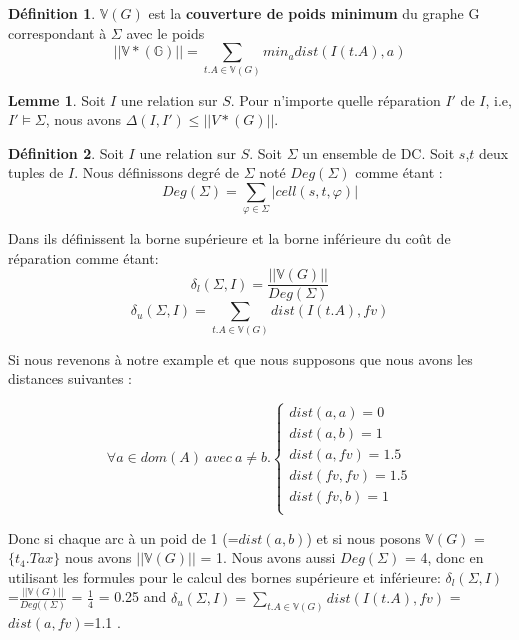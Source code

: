 \documentclass[letterpaper, 12pt]{report}
\theoremstyle{definition}
\newtheorem{mydef}{Définition}
\newtheorem{mylemma}{Lemme}
\begin{document}
\begin{mydef}
	$\mathbb{V}(G)$ est la \textbf{couverture de poids minimum} du graphe G correspondant à $\Sigma$ avec le poids
	$$||\mathbb{V*(G)}|| = \sum_{t.A \in \mathbb{V}(G)} min_{a} dist(I(t.A),a)$$
\end{mydef}

\begin{mylemma}
	Soit $I$ une relation sur $S$. Pour n'importe quelle réparation $I'$ de $I$, i.e, $I' \models \Sigma$, nous avons $\Delta(I,I') \leq ||V*(G)||$. 
\end{mylemma}

\begin{mydef}
	Soit $I$ une relation sur $S$. Soit $\Sigma$ un ensemble de DC. Soit $s$,$t$ deux tuples de $I$. Nous définissons degré de $\Sigma$ noté $Deg(\Sigma)$ comme étant : $$Deg(\Sigma) = \sum_{\varphi \in \Sigma} |cell(s,t,\varphi)|$$
\end{mydef}


Dans \cite{main} ils définissent la borne supérieure et la borne inférieure du coût de réparation comme étant:
$$ \delta_l(\Sigma,I) = \frac{||\mathbb{V}(G)||}{Deg(\Sigma)}$$
$$ \delta_u(\Sigma,I) = \sum_{t.A \in \mathbb{V}(G)} dist(I(t.A),fv)$$

Si nous revenons à notre example et que nous supposons que nous avons les distances suivantes :

$$
\forall a \in dom(A) \ avec \ a \neq b.
\left\{
	\begin{array}{ll}
	   dist(a,a)=0\\
	   dist(a,b)=1\\
	   dist(a,fv)=1.5\\
	   dist(fv,fv)=1.5\\
	   dist(fv,b)=1\\
	\end{array}
\right.
$$

Donc si chaque arc à un poid de 1 (=$ dist(a,b)$) et si nous posons $\mathbb{V}(G)$ = $\{t_4.Tax \}$ nous avons $||\mathbb{V}(G)||$ = 1. Nous avons aussi $Deg(\Sigma)$ = 4, donc en utilisant les formules pour le calcul des bornes supérieure et inférieure: $\delta_l(\Sigma,I)$=$\frac{||\mathbb{V}(G)||}{Deg((\Sigma)}$ = $\frac{1}{4}$ = 0.25 and $\delta_u(\Sigma,I) = \sum_{t.A \in \mathbb{V}(G)} dist(I(t.A),fv)$ = $dist(a,fv)$=1.1 .
\end{document}
